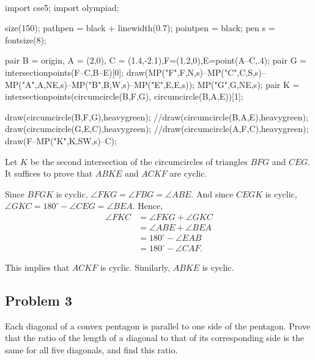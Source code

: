 \begin{mdsoln}
    \ 
\begin{center}
    \begin{asy}
        import cse5;
        import olympiad;

        size(150);
        pathpen = black + linewidth(0.7); 
        pointpen = black; 
        pen s = fontsize(8);

        pair B = origin, A = (2,0), C = (1.4,-2.1),F=(1.2,0),E=point(A--C,.4);
        pair G = intersectionpoints(F--C,B--E)[0];
        draw(MP("F",F,N,s)--MP("C",C,S,s)--MP("A",A,NE,s)--MP("B",B,W,s)--MP("E",E,E,s));
        MP("G",G,NE,s);
        pair K = intersectionpoints(circumcircle(B,F,G), circumcircle(B,A,E))[1];

        draw(circumcircle(B,F,G),heavygreen);
        //draw(circumcircle(B,A,E),heavygreen);
        draw(circumcircle(G,E,C),heavygreen);
        //draw(circumcircle(A,F,C),heavygreen);
        draw(F--MP("K",K,SW,s)--C);
    
\end{asy}   
\end{center}

Let $K$ be the second intersection of the circumcircles of triangles $BFG$ and $CEG$. It suffices to prove that $ABKE$ and $ACKF$ are cyclic.

Since $BFGK$ is cyclic, $\angle FKG = \angle FBG = \angle ABE$. And since $CEGK$ is cyclic, $\angle GKC = 180^{\circ} - \angle CEG = \angle BEA$. Hence,
\begin{align*}
\angle FKC &= \angle FKG + \angle GKC \\
&= \angle ABE + \angle BEA \\
&= 180^{\circ} - \angle EAB \\ 
& = 180^{\circ} - \angle CAF.
\end{align*}

This implies that $ACKF$ is cyclic. Similarly, $ABKE$ is cyclic.

\end{mdsoln}
\subsection{Problem 3}

Each diagonal of a convex pentagon is parallel to one side of the pentagon. Prove that the ratio of the length of a diagonal to that of its corresponding side is the same for all five diagonals, and find this ratio.

